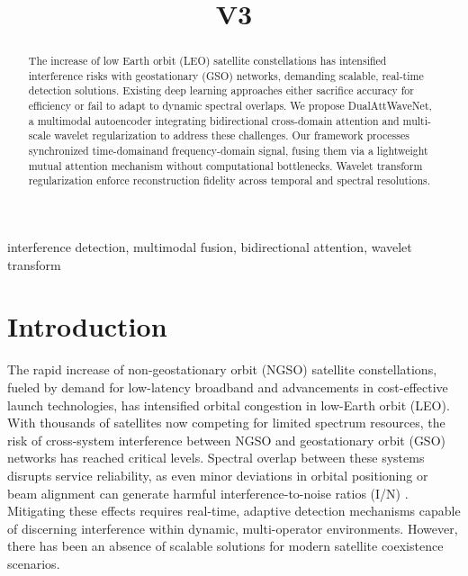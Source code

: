 \documentclass[10pt, conference]{IEEEtran}
\begin{document}
\title{V3}

\author{
}

\maketitle

\begin{abstract}
    The increase of low Earth orbit (LEO) satellite constellations has intensified interference risks with geostationary (GSO) networks, demanding scalable, real-time detection solutions. Existing deep learning approaches either sacrifice accuracy for efficiency or fail to adapt to dynamic spectral overlaps. We propose DualAttWaveNet, a multimodal autoencoder integrating bidirectional cross-domain attention and multi-scale wavelet regularization to address these challenges. Our framework processes synchronized time-domainand frequency-domain signal, fusing them via a lightweight mutual attention mechanism without computational bottlenecks. Wavelet transform regularization enforce reconstruction fidelity across temporal and spectral resolutions.
\end{abstract}

\begin{IEEEkeywords}
    interference detection, multimodal fusion, bidirectional attention, wavelet transform
\end{IEEEkeywords}

\section{Introduction}

The rapid increase of non-geostationary orbit (NGSO) satellite constellations, fueled by demand for low-latency broadband and advancements in cost-effective launch technologies, has intensified orbital congestion in low-Earth orbit (LEO). With thousands of satellites now competing for limited spectrum resources, the risk of cross-system interference between NGSO and geostationary orbit (GSO) networks has reached critical levels. Spectral overlap between these systems disrupts service reliability, as even minor deviations in orbital positioning or beam alignment can generate harmful interference-to-noise ratios (I/N) \cite{itu2020}. Mitigating these effects requires real-time, adaptive detection mechanisms capable of discerning interference within dynamic, multi-operator environments. However, there has been an absence of scalable solutions for modern satellite coexistence scenarios.
\end{document}
